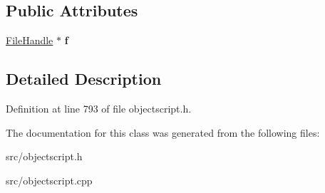 \subsection*{Public Attributes}
\begin{DoxyCompactItemize}
\item 
\hyperlink{struct_object_script_1_1_o_s_1_1_file_handle}{File\+Handle} $\ast$ {\bfseries f}\hypertarget{class_object_script_1_1_o_s_1_1_core_1_1_file_stream_reader_a9b099a1aad7e41cefaab028a0f88a54a}{}\label{class_object_script_1_1_o_s_1_1_core_1_1_file_stream_reader_a9b099a1aad7e41cefaab028a0f88a54a}

\end{DoxyCompactItemize}


\subsection{Detailed Description}


Definition at line 793 of file objectscript.\+h.



The documentation for this class was generated from the following files\+:\begin{DoxyCompactItemize}
\item 
src/objectscript.\+h\item 
src/objectscript.\+cpp\end{DoxyCompactItemize}
